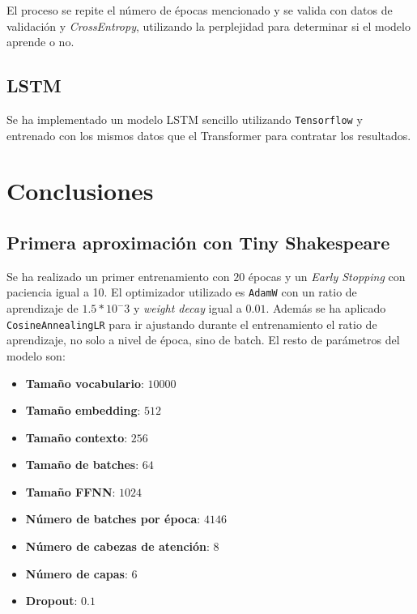 \documentclass[11pt]{book}
\newcommand{\clearemptydoublepage}{\newpage{\pagestyle{empty}\cleardoublepage}}
\begin{document}
El proceso se repite el número de épocas mencionado y se valida con datos de validación y \textit{CrossEntropy}, utilizando la perplejidad para determinar si el modelo aprende o no.


\section{LSTM}

Se ha implementado un modelo LSTM sencillo utilizando \texttt{Tensorflow} y entrenado con los mismos datos que el Transformer para contratar los resultados. 





\clearemptydoublepage

\chapter{Conclusiones}

\section{Primera aproximación con Tiny Shakespeare}

Se ha realizado un primer entrenamiento con $20$ épocas y un \textit{Early Stopping} con paciencia igual a 10. El optimizador utilizado es \texttt{AdamW} con un ratio de aprendizaje de $1.5*10^-3$ y \textit{weight decay} igual a $0.01$. Además se ha aplicado \texttt{CosineAnnealingLR} para ir ajustando durante el entrenamiento el ratio de aprendizaje, no solo a nivel de época, sino de batch. El resto de parámetros del modelo son: 

\begin{itemize}
    \item \textbf{Tamaño vocabulario}: $10000$
    \item \textbf{Tamaño embedding}: $512$
    \item \textbf{Tamaño contexto}: $256$
    \item \textbf{Tamaño de batches}: $64$
    \item \textbf{Tamaño FFNN}: $1024$
    \item \textbf{Número de batches por época}: $4146$
    \item \textbf{Número de cabezas de atención}: $8$
    \item \textbf{Número de capas}: $6$
    \item \textbf{Dropout}: $0.1$
\end{itemize}
\end{document}
